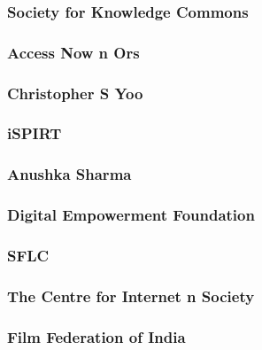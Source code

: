 \documentclass{article}
\begin{document}
\subsubsection{Society for Knowledge Commons}


\subsubsection{Access Now n Ors}


\subsubsection{Christopher S Yoo}


\subsubsection{iSPIRT}


\subsubsection{Anushka Sharma}


\subsubsection{Digital Empowerment Foundation}


\subsubsection{SFLC}


\subsubsection{The Centre for Internet n Society}


\subsubsection{Film Federation of India}

\end{document}
